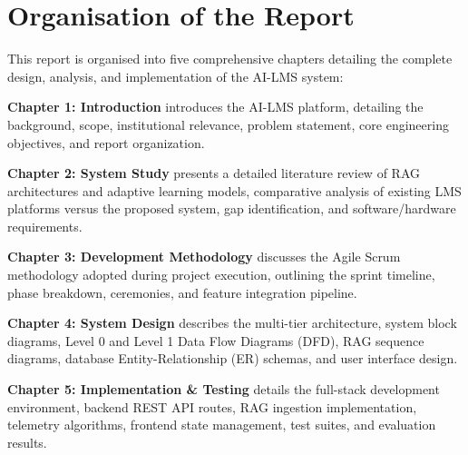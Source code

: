 \newpage
\section{Organisation of the Report}

This report is organised into five comprehensive chapters detailing the complete design, analysis, and implementation of the AI-LMS system:

\textbf{Chapter 1: Introduction} introduces the AI-LMS platform, detailing the background, scope, institutional relevance, problem statement, core engineering objectives, and report organization.

\textbf{Chapter 2: System Study} presents a detailed literature review of RAG architectures and adaptive learning models, comparative analysis of existing LMS platforms versus the proposed system, gap identification, and software/hardware requirements.

\textbf{Chapter 3: Development Methodology} discusses the Agile Scrum methodology adopted during project execution, outlining the sprint timeline, phase breakdown, ceremonies, and feature integration pipeline.

\textbf{Chapter 4: System Design} describes the multi-tier architecture, system block diagrams, Level 0 and Level 1 Data Flow Diagrams (DFD), RAG sequence diagrams, database Entity-Relationship (ER) schemas, and user interface design.

\textbf{Chapter 5: Implementation \& Testing} details the full-stack development environment, backend REST API routes, RAG ingestion implementation, telemetry algorithms, frontend state management, test suites, and evaluation results.
